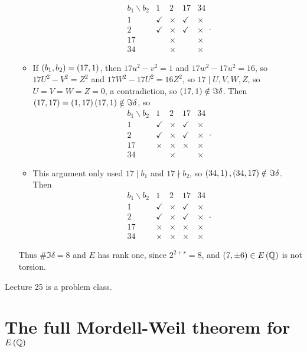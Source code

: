 \begin{example}
\begin{itemize}
\begin{itemize}
$$\begin{array}{c|cccc}
b_1 \backslash b_2 & 1 & 2 & 17 & 34 \\
\hline
1 & \checkmark & \times & \checkmark & \times \\
2 & \checkmark & \times & \checkmark & \times \\
17 & & \times & & \times \\
34 & & \times & & \times
\end{array}.
$$
\item If $ \br{b_1, b_2} = \br{17, 1} $, then $ 17u^2 - v^2 = 1 $ and $ 17w^2 - 17u^2 = 16 $, so $ 17U^2 - V^2 = Z^2 $ and $ 17W^2 - 17U^2 = 16Z^2 $, so $ 17 \mid U, V, W, Z $, so $ U = V = W = Z = 0 $, a contradiction, so $ \br{17, 1} \notin \Im \delta $. Then $ \br{17, 17} = \br{1, 17}\br{17, 1} \notin \Im \delta $, so
$$
\begin{array}{c|cccc}
b_1 \backslash b_2 & 1 & 2 & 17 & 34 \\
\hline
1 & \checkmark & \times & \checkmark & \times \\
2 & \checkmark & \times & \checkmark & \times \\
17 & \times & \times & \times & \times \\
34 & & \times & & \times
\end{array}.
$$
\item This argument only used $ 17 \mid b_1 $ and $ 17 \nmid b_2 $, so $ \br{34, 1}, \br{34, 17} \notin \Im \delta $. Then
$$
\begin{array}{c|cccc}
b_1 \backslash b_2 & 1 & 2 & 17 & 34 \\
\hline
1 & \checkmark & \times & \checkmark & \times \\
2 & \checkmark & \times & \checkmark & \times \\
17 & \times & \times & \times & \times \\
34 & \times & \times & \times & \times
\end{array}.
$$
\end{itemize}
Thus $ \#\Im \delta = 8 $ and $ E $ has rank one, since $ 2^{2 + r} = 8 $, and $ \br{7, \pm 6} \in E\br{\QQ} $ is not torsion.
\end{itemize}
\end{example}


Lecture 25 is a problem class.

\pagebreak

\section{The full Mordell-Weil theorem for \texorpdfstring{$ E\br{\QQ} $}{E(Q)}}

